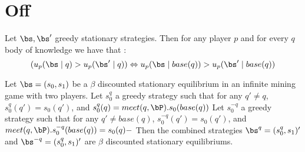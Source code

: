 

\section{Off}
\begin{mylem}
	\label{lemsup}
	Let $\bs, \bs'$ greedy stationary strategies. Then for any player $p$ and for every $q$ body of knowledge we have that :  $$(u_p(\bs \mid q) > u_p(\bs' \mid q))  \Leftrightarrow  u_p(\bs \mid base(q)) > u_p(\bs' \mid base(q))$$ 
\end{mylem}

\begin{mylem}
	Let $\bs = (s_0,s_1)$ be a $\beta$ discounted stationary equilibrium in an infinite mining game with two players. 
	Let $s^q_0$ a greedy strategy such that for any $q' \neq q$, $s^q_0(q') = s_0(q')$, and $s^q_0(q) = meet(q,\bP) . s_0(base(q))$
	Let $s^{-q}_0$ a greedy strategy such that for any $q' \neq base(q)$, $s^{-q}_0(q') = s_0(q')$, and $meet(q,\bP).s^{-q}_0(base(q)) =  s_0(q)-$
	Then the combined strategies $\bs^q = (s^q_0,s_1)'$ and $\bs^{-q} = (s^q_0,s_1)'$  are $\beta$ discounted stationary equilibriums.
\end{mylem}

